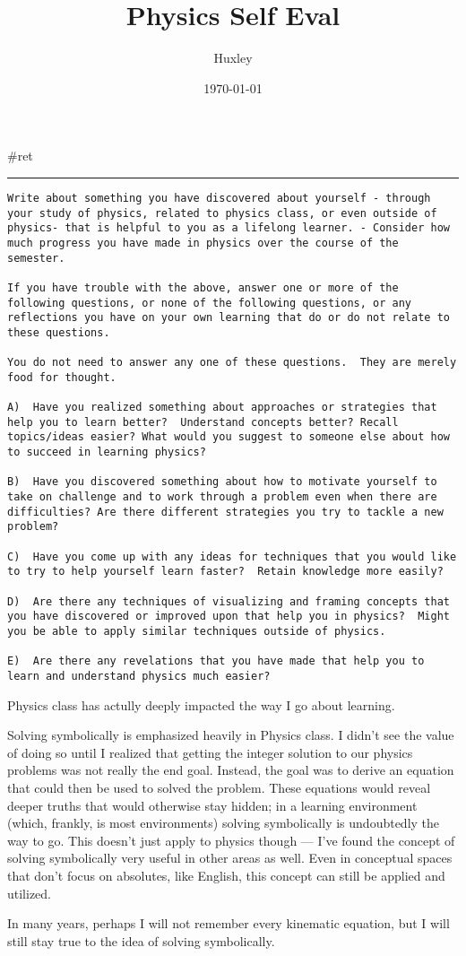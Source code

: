 \documentclass[letterpaper]{article}
\author{Huxley}
\date{\today}
\title{Physics Self Eval}
\renewcommand\maketitle{}
\begin{document}
\maketitle
\#ret

\noindent\rule{\textwidth}{0.5pt}

\begin{verbatim}
Write about something you have discovered about yourself - through your study of physics, related to physics class, or even outside of physics- that is helpful to you as a lifelong learner. - Consider how much progress you have made in physics over the course of the semester.

If you have trouble with the above, answer one or more of the following questions, or none of the following questions, or any reflections you have on your own learning that do or do not relate to these questions.

You do not need to answer any one of these questions.  They are merely food for thought.

A)  Have you realized something about approaches or strategies that help you to learn better?  Understand concepts better? Recall topics/ideas easier? What would you suggest to someone else about how to succeed in learning physics?

B)  Have you discovered something about how to motivate yourself to take on challenge and to work through a problem even when there are difficulties? Are there different strategies you try to tackle a new problem?

C)  Have you come up with any ideas for techniques that you would like to try to help yourself learn faster?  Retain knowledge more easily?

D)  Are there any techniques of visualizing and framing concepts that you have discovered or improved upon that help you in physics?  Might you be able to apply similar techniques outside of physics.

E)  Are there any revelations that you have made that help you to learn and understand physics much easier?
\end{verbatim}

Physics class has actully deeply impacted the way I go about learning.

Solving symbolically is emphasized heavily in Physics class. I didn't
see the value of doing so until I realized that getting the integer
solution to our physics problems was not really the end goal. Instead,
the goal was to derive an equation that could then be used to solved the
problem. These equations would reveal deeper truths that would otherwise
stay hidden; in a learning environment (which, frankly, is most
environments) solving symbolically is undoubtedly the way to go. This
doesn't just apply to physics though --- I've found the concept of
solving symbolically very useful in other areas as well. Even in
conceptual spaces that don't focus on absolutes, like English, this
concept can still be applied and utilized.

In many years, perhaps I will not remember every kinematic equation, but
I will still stay true to the idea of solving symbolically.
\end{document}
